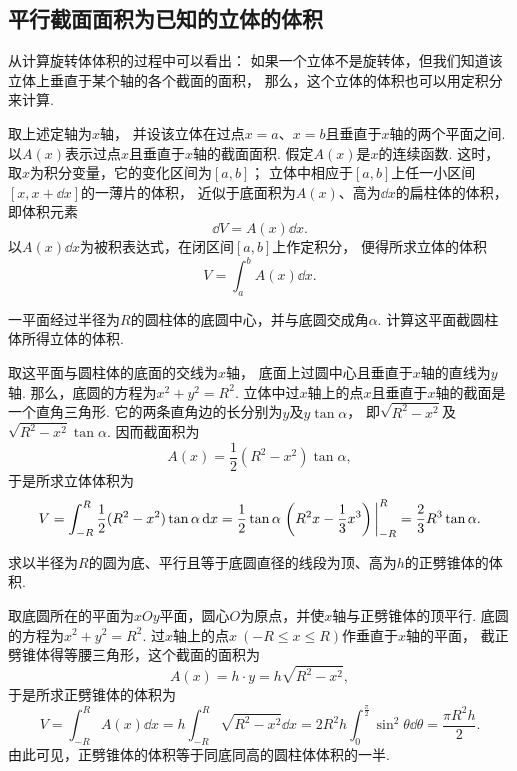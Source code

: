 \subsection{平行截面面积为已知的立体的体积}
从计算旋转体体积的过程中可以看出：
如果一个立体不是旋转体，但我们知道该立体上垂直于某个轴的各个截面的面积，
那么，这个立体的体积也可以用定积分来计算.

取上述定轴为\(x\)轴，
并设该立体在过点\(x=a\)、\(x=b\)且垂直于\(x\)轴的两个平面之间.
以\(A(x)\)表示过点\(x\)且垂直于\(x\)轴的截面面积.
假定\(A(x)\)是\(x\)的连续函数.
这时，取\(x\)为积分变量，它的变化区间为\([a,b]\)；
立体中相应于\([a,b]\)上任一小区间\([x,x+\dd{x}]\)的一薄片的体积，
近似于底面积为\(A(x)\)、高为\(\dd{x}\)的扁柱体的体积，
即体积元素\[
	\dd{V} = A(x) \dd{x}.
\]
以\(A(x) \dd{x}\)为被积表达式，在闭区间\([a,b]\)上作定积分，
便得所求立体的体积\[
	V = \int_a^b A(x) \dd{x}.
\]

\begin{example}
一平面经过半径为\(R\)的圆柱体的底圆中心，并与底圆交成角\(\alpha\).
计算这平面截圆柱体所得立体的体积.
\begin{solution}
取这平面与圆柱体的底面的交线为\(x\)轴，
底面上过圆中心且垂直于\(x\)轴的直线为\(y\)轴.
那么，底圆的方程为\(x^2+y^2=R^2\).
立体中过\(x\)轴上的点\(x\)且垂直于\(x\)轴的截面是一个直角三角形.
它的两条直角边的长分别为\(y\)及\(y \tan\alpha\)，
即\(\sqrt{R^2-x^2}\)及\(\sqrt{R^2-x^2} \tan\alpha\).
因而截面积为\[
	A(x) = \frac12 (R^2-x^2) \tan\alpha,
\]
于是所求立体体积为\[
	V = \int_{-R}^R \frac12 (R^2-x^2) \tan\alpha \dd{x}
	= \frac12 \tan\alpha \eval{\left(R^2x-\frac13x^3\right)}_{-R}^R
	= \frac23 R^3 \tan\alpha.
\]
\end{solution}
\end{example}

\begin{example}
求以半径为\(R\)的圆为底、平行且等于底圆直径的线段为顶、高为\(h\)的正劈锥体的体积.
\begin{solution}
取底圆所在的平面为\(xOy\)平面，圆心\(O\)为原点，并使\(x\)轴与正劈锥体的顶平行.
底圆的方程为\(x^2+y^2=R^2\).
过\(x\)轴上的点\(x\ (-R \leq x \leq R)\)作垂直于\(x\)轴的平面，
截正劈锥体得等腰三角形，这个截面的面积为\[
	A(x) = h \cdot y = h \sqrt{R^2-x^2},
\]
于是所求正劈锥体的体积为\[
	V = \int_{-R}^R A(x) \dd{x}
	= h \int_{-R}^R \sqrt{R^2-x^2} \dd{x}
	= 2 R^2 h \int_0^{\frac\pi2} \sin^2\theta \dd{\theta}
	= \frac{\pi R^2 h}2.
\]
由此可见，正劈锥体的体积等于同底同高的圆柱体体积的一半.
\end{solution}
\end{example}

